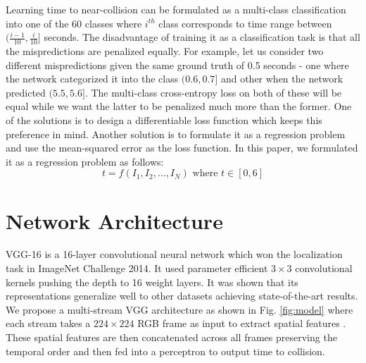 Learning time to near-collision can be formulated as a multi-class classification into one of the 60 classes where $i^{th}$ class corresponds to time range between $(\frac{i-1}{10}, \frac{i}{10}]$ seconds. The disadvantage of training it as a classification task is that all the mispredictions are penalized equally. For example, let us consider two different mispredictions given the same ground truth of 0.5 seconds - one where the network categorized it into the class $(0.6, 0.7]$ and other when the network predicted $(5.5, 5.6]$. The multi-class cross-entropy loss on both of these will be equal while we want the latter to be penalized much more than the former. One of the solutions is to design a differentiable loss function which keeps this preference in mind. Another solution is to formulate it as a regression problem and use the mean-squared error as the loss function. In this paper, we formulated it as a regression problem as follows:
$$
t = f(I_{1}, I_{2}, \hdots, I_{N}) \text{ where } t \in [0,6]
$$

\section{Network Architecture}
VGG-16 \cite{vgg} is a 16-layer convolutional neural network which won the localization task in ImageNet Challenge 2014. It used parameter efficient $3 \times 3$ convolutional kernels pushing the depth to 16 weight layers. It was shown that its representations generalize well to other datasets achieving state-of-the-art results. We propose a multi-stream VGG architecture as shown in Fig. \ref{fig:model} where each stream takes a $224 \times 224$ RGB frame as input to extract spatial features . These spatial features are then concatenated across all frames preserving the temporal order and then fed into a perceptron to output time to collision. \\


